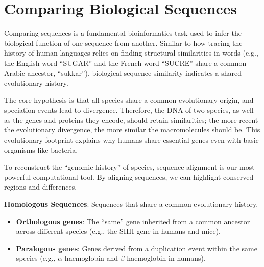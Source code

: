 

\section{Comparing Biological Sequences}

Comparing sequences is a fundamental bioinformatics task used to infer the biological function of one sequence from another. Similar to how tracing the history of human languages relies on finding structural similarities in words (e.g., the English word ``SUGAR'' and the French word ``SUCRE'' share a common Arabic ancestor, ``sukkar''), biological sequence similarity indicates a shared evolutionary history. 

The core hypothesis is that all species share a common evolutionary origin, and speciation events lead to divergence. Therefore, the DNA of two species, as well as the genes and proteins they encode, should retain similarities; the more recent the evolutionary divergence, the more similar the macromolecules should be. This evolutionary footprint explains why humans share essential genes even with basic organisms like bacteria.


To reconstruct the ``genomic history'' of species, sequence alignment is our most powerful computational tool. By aligning sequences, we can highlight conserved regions and differences. 


\begin{important}
    \textbf{Homologous Sequences}: Sequences that share a common evolutionary history.
    \begin{itemize}
        \item \textbf{Orthologous genes}: The ``same'' gene inherited from a common ancestor across different species (e.g., the SHH gene in humans and mice).
        \item \textbf{Paralogous genes}: Genes derived from a duplication event within the same species (e.g., $\alpha$-haemoglobin and $\beta$-haemoglobin in humans).
    \end{itemize}
\end{important}


